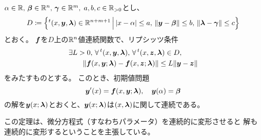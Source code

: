 \documentclass[report]{jlreq}
\begin{document}
\begin{theorem}[1.2.8 パラメータに関する解の連続性]
    $\alpha \in \R,\, \bm{\beta} \in \R^n,\, \bm{\gamma} \in \R^m,\; a,b,c \in \R_{>0}$とし、
    \begin{equation}
        D \coloneqq \left\{
            {}^t (x, \by, \bm{\lambda}) \in \R^{n+m+1}
            \,\Big|\,
            |x - \alpha| \le a,\,
            \|\by - \bbeta\| \le b,\,
            \|\blambda - \bgamma\| \le c
        \right\}
    \end{equation}
    とおく。
    $\bf$を$D$上の$\R^n$値連続関数で、リプシッツ条件
    \begin{equation}
        \begin{split}
            &\exists L > 0,\,
                \forall\, {}^t (x, \by, \blambda),\,
                \forall\, {}^t (x, \bz, \blambda) \in D, \\
            &\qquad \| \bf(x, \by; \blambda) - \bf(x, \bz; \blambda) \| \le L \| \by - \bz \|
        \end{split}
    \end{equation}
    をみたすものとする。
    このとき、初期値問題
    \begin{equation}
        \by'(x) = \bf(x, \by; \blambda),\quad \by(\alpha) = \bbeta
    \end{equation}
    の解を$\by(x; \blambda)$とおくと、$\by(x; \blambda)$は$(x, \blambda)$に関して連続である。
\end{theorem}

この定理は、微分方程式（すなわちパラメータ）を連続的に変形させると
解も連続的に変形するということを主張している。
\end{document}
